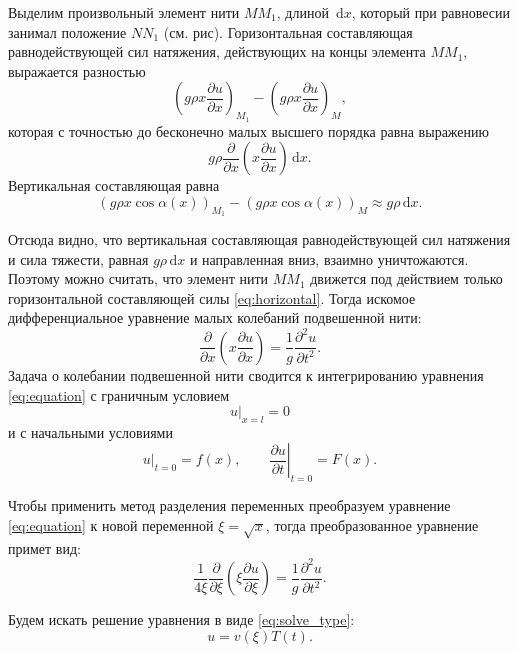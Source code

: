 \documentclass[a4paper, 14pt]{extarticle}
\renewcommand{\d}{\,\mathrm{d}}
\newcommand{\pder}[2]{\frac{\partial #1}{\partial #2}}
\newcommand{\pdder}[2]{\frac{\partial^2 #1}{\partial #2^2}}
\begin{document}
Выделим произвольный элемент нити \( MM_1 \), длиной \( \d x \), который при
равновесии занимал положение \( NN_1 \) (см. рис). Горизонтальная составляющая
равнодействующей сил натяжения, действующих на концы элемента \( MM_1 \),
выражается разностью
\[
    \left(g\rho x\pder{u}{x}\right)_{M_1} - \left(g\rho x\pder{u}{x}\right)_M,
\]
которая с точностью до бесконечно малых высшего порядка равна выражению
\begin{equation}
    g\rho\pder{}{x}\left(x\pder{u}{x}\right)\d x.
    \label{eq:horizontal}
\end{equation}
Вертикальная составляющая равна
\[
    (g\rho x\cos\alpha(x))_{M_1} - (g\rho x\cos\alpha(x))_M \approx g\rho\d x.
\]

Отсюда видно, что вертикальная составляющая равнодействующей сил натяжения
и сила тяжести, равная \( g\rho\d x \) и направленная вниз, взаимно уничтожаются.
Поэтому можно считать, что элемент нити \( MM_1 \) движется под действием
только горизонтальной составляющей силы \eqref{eq:horizontal}. Тогда
искомое дифференциальное уравнение малых колебаний подвешенной нити:
\begin{equation}
    \pder{}{x}\left(x\pder{u}{x}\right) = \frac{1}{g}\pdder{u}{t}.
    \label{eq:equation}
\end{equation}
Задача о колебании подвешенной нити сводится к интегрированию уравнения
\eqref{eq:equation} с граничным условием
\begin{equation}
    u|_{x = l} = 0
    \label{condition_corner}
\end{equation}
и с начальными условиями
\begin{equation}
    u|_{t = 0} = f(x), \hspace{2em} \left.\pder{u}{t}\right|_{t = 0} = F(x).
    \label{condition_zero}
\end{equation}

Чтобы применить метод разделения переменных преобразуем уравнение
\eqref{eq:equation} к новой переменной \( \xi = \sqrt{x} \), тогда преобразованное
уравнение примет вид:
\begin{equation}
    \frac{1}{4\xi}\pder{}{\xi}\left(\xi\pder{u}{\xi}\right) = \frac{1}{g}\pdder{u}{t}.
    \label{eq:eq_xi}
\end{equation}

Будем искать решение уравнения в виде \eqref{eq:solve_type}:
\begin{equation}
    u = v(\xi)T(t).
    \label{eq:solve_type}
\end{equation}
\end{document}
